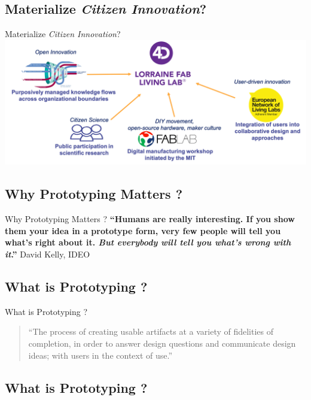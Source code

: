 \documentclass[
  ignorenonframetext,
  aspectratio=169,
  c]{beamer}
\begin{document}
\subsection{\texorpdfstring{Materialize \emph{Citizen
Innovation}?}{Materialize Citizen Innovation?}}\label{materialize-citizen-innovation}

\begin{frame}{Materialize \emph{Citizen Innovation}?}
\includegraphics{figures/Materialize-Innovation-00.png}
\end{frame}

\subsection{Why Prototyping Matters ?}\label{why-prototyping-matters}

\begin{frame}{Why Prototyping Matters ?}
\textbf{``Humans are really interesting. If you show them your idea in a
prototype form, very few people will tell you what's right about it.
\emph{But everybody will tell you what's wrong with it}.''} David Kelly,
IDEO
\end{frame}

\subsection{What is Prototyping ?}\label{what-is-prototyping}

\begin{frame}{What is Prototyping ?}
\begin{quote}
``The process of creating usable artifacts at a variety of fidelities of
completion, in order to answer design questions and communicate design
ideas; with users in the context of use.''
\end{quote}
\end{frame}

\subsection{What is Prototyping ?}\label{what-is-prototyping-1}
\end{document}
